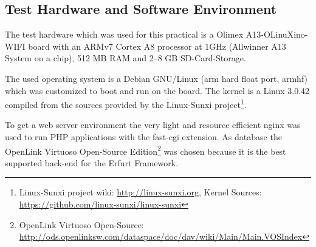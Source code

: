 \documentclass{llncs}
\begin{document}
\subsection{Test Hardware and Software Environment}
The test hardware which was used for this practical is a Olimex A13-OLinuXino-WIFI board with an ARMv7 Cortex A8 processor at 1GHz (Allwinner A13 System on a chip), 512 MB RAM and 2–8 GB SD-Card-Storage.

The used operating system is a Debian GNU/Linux (arm hard float port, armhf) which was customized to boot and run on the board.
The kernel is a Linux 3.0.42 compiled from the sources provided by the Linux-Sunxi project\footnote{Linux-Sunxi project wiki: \url{http://linux-sunxi.org}, Kernel Sources: \url{https://github.com/linux-sunxi/linux-sunxi}}.

To get a web server environment the very light and resource efficient nginx was used to run PHP applications with the fast-cgi extension.
As database the Open\-Link Vir\-tu\-oso Open-Source Edition\footnote{Open\-Link Vir\-tu\-oso Open-Source: \url{http://ods.openlinksw.com/dataspace/doc/dav/wiki/Main/Main.VOSIndex}} was chosen because it is the best supported back-end for the Erfurt Framework.


\todos



\end{document}
